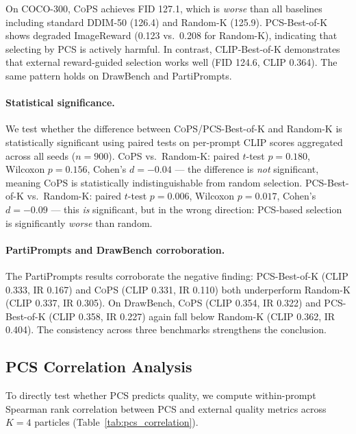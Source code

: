 \documentclass{article}
\newcommand{\cops}{\textsc{CoPS}}
\newcommand{\pcs}{\textsc{PCS}}
\begin{document}
On COCO-300, \cops{} achieves FID 127.1, which is \emph{worse} than all baselines including standard DDIM-50 (126.4) and Random-K (125.9). PCS-Best-of-K shows degraded ImageReward (0.123 vs.\ 0.208 for Random-K), indicating that selecting by \pcs{} is actively harmful. In contrast, CLIP-Best-of-K demonstrates that external reward-guided selection works well (FID 124.6, CLIP 0.364). The same pattern holds on DrawBench and PartiPrompts.

\paragraph{Statistical significance.} We test whether the difference between \cops{}/PCS-Best-of-K and Random-K is statistically significant using paired tests on per-prompt CLIP scores aggregated across all seeds ($n = 900$). \cops{} vs.\ Random-K: paired $t$-test $p = 0.180$, Wilcoxon $p = 0.156$, Cohen's $d = -0.04$ --- the difference is \emph{not} significant, meaning \cops{} is statistically indistinguishable from random selection. PCS-Best-of-K vs.\ Random-K: paired $t$-test $p = 0.006$, Wilcoxon $p = 0.017$, Cohen's $d = -0.09$ --- this \emph{is} significant, but in the wrong direction: PCS-based selection is significantly \emph{worse} than random.

\paragraph{PartiPrompts and DrawBench corroboration.} The PartiPrompts results corroborate the negative finding: PCS-Best-of-K (CLIP 0.333, IR 0.167) and \cops{} (CLIP 0.331, IR 0.110) both underperform Random-K (CLIP 0.337, IR 0.305). On DrawBench, \cops{} (CLIP 0.354, IR 0.322) and PCS-Best-of-K (CLIP 0.358, IR 0.227) again fall below Random-K (CLIP 0.362, IR 0.404). The consistency across three benchmarks strengthens the conclusion.

\subsection{PCS Correlation Analysis}
\label{sec:pcs_correlation}

To directly test whether \pcs{} predicts quality, we compute within-prompt Spearman rank correlation between \pcs{} and external quality metrics across $K=4$ particles (Table~\ref{tab:pcs_correlation}).
\end{document}
